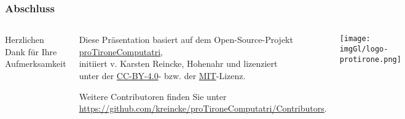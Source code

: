\begin{frame}
  \frametitle{Abschluss}
  \begin{columns}
      Herzlichen Dank für Ihre Aufmerksamkeit
      \vspace{3cm}
    \begin{footnotesize}Diese Präsentation basiert auf dem Open-Source-Projekt \href{https://github.com/kreincke/proTironeComputatri}{proTironeComputatri},\\
      initiiert v. Karsten Reincke, Hohenahr und lizenziert\\
      unter der \href{https://creativecommons.org/licenses/by/4.0/}{CC-BY-4.0}- bzw. der \href{https://github.com/kreincke/proTironeComputatri/LICENSE.MIT.md}{MIT}-Lizenz. 
    
    Weitere Contributoren finden Sie unter \\
    \tiny{\href{https://github.com/kreincke/proTironeComputatri/Contributors}{https://github.com/kreincke/proTironeComputatri/Contributors}}.
    \end{footnotesize}

    \vspace{0.2cm}
    \texttt{[image: \\imgGl/logo-protirone.png]}
  \end{columns}

\end{frame}